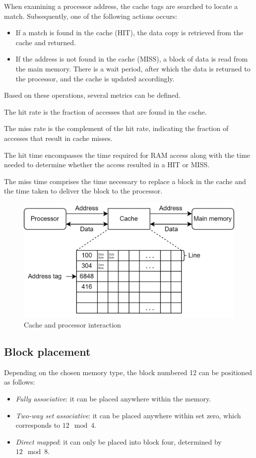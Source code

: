 When examining a processor address, the cache tags are searched to locate a match. 
Subsequently, one of the following actions occurs:
\begin{itemize}
    \item If a match is found in the cache (HIT), the data copy is retrieved from the cache and returned.
    \item If the address is not found in the cache (MISS), a block of data is read from the main memory.
        There is a wait period, after which the data is returned to the processor, and the cache is updated accordingly.
\end{itemize}
Based on these operations, several metrics can be defined. 
\begin{definition}
    The hit rate is the fraction of accesses that are found in the cache.
\end{definition}
\begin{definition}
    The miss rate is the complement of the hit rate, indicating the fraction of accesses that result in cache misses.
\end{definition}
\begin{definition}
    The hit time encompasses the time required for RAM access along with the time needed to determine whether the access resulted in a HIT or MISS.
\end{definition}
\begin{definition}
    The miss time comprises the time necessary to replace a block in the cache and the time taken to deliver the block to the processor.
\end{definition}
\begin{figure}[H]
    \centering
    \includegraphics[width=0.5\linewidth]{images/cache.png}
    \caption{Cache and processor interaction}
\end{figure}

\subsection{Block placement}
Depending on the chosen memory type, the block numbered 12 can be positioned as follows:
\begin{itemize}
    \item \textit{Fully associative}: it can be placed anywhere within the memory.
    \item \textit{Two-way set associative}: it can be placed anywhere within set zero, which corresponds to $12 \mod 4$.
    \item \textit{Direct mapped}: it can only be placed into block four, determined by $12 \mod 8$. 
\end{itemize}


